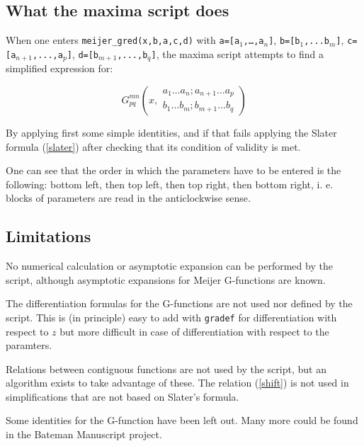 \documentclass[11pt]{article}
\begin{document}
\subsection{What the maxima script does}

When one enters \texttt{meijer\_gred(x,b,a,c,d)} with \texttt{a=[a$_1$,\ldots,a$_n$]}, \texttt{b=[b$_1$,...b$_m$]}, \texttt{c=[a$_{n+1}$,...,a$_p$]}, \texttt{d=[b$_{m+1}$,...,b$_q$]}, the maxima script attempts to find a simplified expression for:

\begin{equation}
  G^{mn}_{pq}\left(x,\begin{array}{c} a_1\ldots a_n;a_{n+1} \ldots a_p \\ b_1\ldots b_m;b_{m+1} \ldots b_q \end{array} \right)
\end{equation}
 
By applying first some simple identities,\cite{meijer1951,wille1988} and if that fails applying the Slater  formula (\ref{slater}) after checking that its condition of validity is met. 

One can see that the order in which the parameters have to be entered is the following: bottom left, then top left, then top right, then bottom right, i. e. blocks of parameters are read in the anticlockwise sense.


\subsection{Limitations} 

No numerical calculation or asymptotic expansion can be 
 performed by the script, although asymptotic expansions for Meijer G-functions are known.\cite{braaksma1962} 

The differentiation formulas for the G-functions are not used 
nor defined by the script.\cite{roach1997} This is (in principle) 
easy to add with \texttt{gradef} for differentiation with respect to $z$ 
but more difficult in case of differentiation with respect to the paramters. 
 

Relations between contiguous functions are not used by the script, but 
an algorithm exists to take advantage of these.\cite{roach1997}   
The relation (\ref{shift}) is not used in simplifications that are not
based on Slater's formula. 

Some identities for the G-function have been left out.\cite{meijer1932,meijer1935,meijer1939,meijer1951} Many more could be found in the Bateman Manuscript
project.
 
\end{document}
